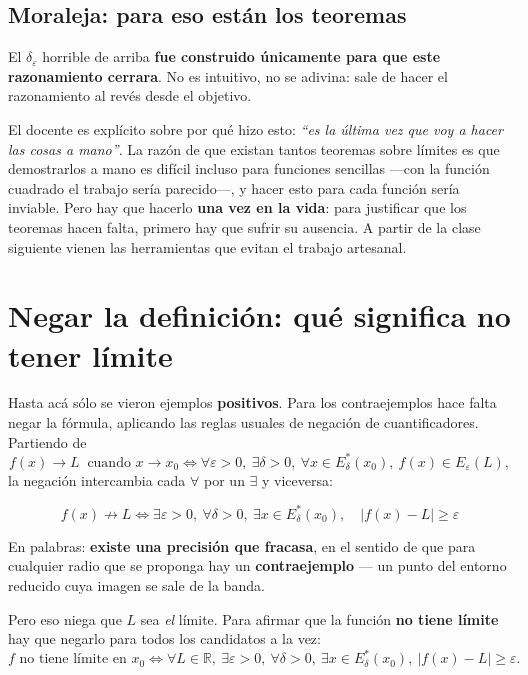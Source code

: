 \documentclass[12pt,a4paper]{article}
\begin{document}
\subsection{Moraleja: para eso están los teoremas}

\begin{notebox}
El $\delta_\varepsilon$ horrible de arriba \textbf{fue construido únicamente
para que este razonamiento cerrara}. No es intuitivo, no se adivina: sale de
hacer el razonamiento al revés desde el objetivo.
\end{notebox}

El docente es explícito sobre por qué hizo esto: \emph{``es la última vez que
voy a hacer las cosas a mano''}. La razón de que existan tantos teoremas sobre
límites es que demostrarlos a mano es difícil incluso para funciones sencillas
---con la función cuadrado el trabajo sería parecido---, y hacer esto para cada
función sería inviable. Pero hay que hacerlo \textbf{una vez en la vida}: para
justificar que los teoremas hacen falta, primero hay que sufrir su ausencia. A
partir de la clase siguiente vienen las herramientas que evitan el trabajo
artesanal.

\section{Negar la definición: qué significa no tener límite}

Hasta acá sólo se vieron ejemplos \textbf{positivos}. Para los contraejemplos
hace falta negar la fórmula, aplicando las reglas usuales de negación de
cuantificadores. Partiendo de
\[
  f(x) \to L \ \text{ cuando } x \to x_0
  \iff \forall \varepsilon > 0,\ \exists \delta > 0,\
  \forall x \in E^{*}_{\delta}(x_0),\ f(x) \in E_{\varepsilon}(L),
\]
la negación intercambia cada $\forall$ por un $\exists$ y viceversa:

\begin{keybox}
\[
  \boxed{\ f(x) \not\to L
  \iff \exists \varepsilon > 0,\ \forall \delta > 0,\
  \exists x \in E^{*}_{\delta}(x_0),\quad |f(x) - L| \geq \varepsilon\ }
\]
\end{keybox}

En palabras: \textbf{existe una precisión que fracasa}, en el sentido de que
para cualquier radio que se proponga hay un \textbf{contraejemplo} --- un punto
del entorno reducido cuya imagen se sale de la banda.

Pero eso niega que $L$ sea \emph{el} límite. Para afirmar que la función
\textbf{no tiene límite} hay que negarlo para todos los candidatos a la vez:
\[
  f \text{ no tiene límite en } x_0
  \iff \forall L \in \mathbb{R},\ \exists \varepsilon > 0,\
  \forall \delta > 0,\ \exists x \in E^{*}_{\delta}(x_0),\
  |f(x) - L| \geq \varepsilon.
\]
\end{document}
